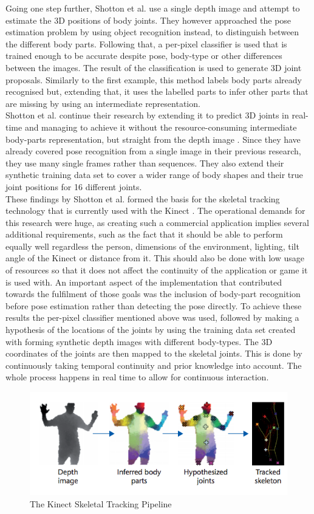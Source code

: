 Going one step further, Shotton et al. \cite{Shotton2011} use a single depth image and attempt to estimate the  3D positions of body joints. They however approached the pose estimation problem by using object recognition instead, to distinguish between the different body parts. Following that, a per-pixel classifier is used that is trained enough to be accurate despite pose, body-type or other differences between the images. The result of the classification is used to generate 3D joint proposals. Similarly to the first example, this method labels body parts already recognised but, extending that, it uses the labelled parts to infer other parts that are missing by using an intermediate representation.\\

Shotton et al. continue their research by extending it to predict 3D joints in real-time and managing to achieve it without the resource-consuming intermediate body-parts representation, but straight from the depth image \cite{Girshick2011}. Since they have already covered pose recognition from a single image in their previous research, they use many single frames rather than sequences. They also extend their synthetic training data set to cover a wider range of body shapes and their true joint positions for 16 different joints.\\

These findings by Shotton et al. formed the basis for the skeletal tracking technology that is currently used with the Kinect \cite{Zhang2012}. The operational demands for this research were huge, as creating such a commercial application implies several additional requirements, such as the fact that it should be able to perform equally well regardless the person, dimensions of the environment, lighting, tilt angle of the Kinect or distance from it. This should also be done with low usage of resources so that it does not affect the continuity of the application or game it is used with. An important aspect of the implementation that contributed towards the fulfilment of those goals was the inclusion of body-part recognition before pose estimation rather than detecting the pose directly. To achieve these results the per-pixel classifier mentioned above was used, followed by making a hypothesis of the locations of the joints by using the training data set created with forming synthetic depth images with different body-types. The 3D coordinates of the joints are then mapped to the skeletal joints. This is done by continuously taking temporal continuity and prior knowledge into account. The whole process happens in real time to allow for continuous interaction.\\

\begin{figure}
    \centering
    \includegraphics[scale=0.5]{zscreenshots/skeletonJoints.png}
    \caption{The Kinect Skeletal Tracking Pipeline}
\end{figure}